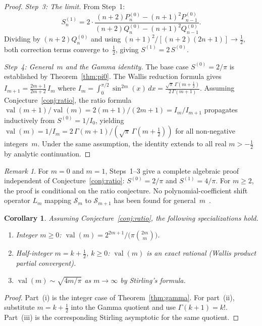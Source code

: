 \documentclass[11pt,a4paper]{article}
\theoremstyle{plain}
\newtheorem{corollary}[theorem]{Corollary}
\theoremstyle{definition}
\theoremstyle{remark}
\newtheorem{remark}[theorem]{Remark}
\newcommand{\half}{\tfrac{1}{2}}
\begin{document}
\begin{proof}
\medskip
\emph{Step~3: The limit.}
From Step~1:
\[
  S_n^{(1)}
  = 2\cdot\frac{(n{+}2)P_n^{(0)} - (n{+}1)^2 P_{n-1}^{(0)}}
              {(n{+}2)Q_n^{(0)} - (n{+}1)^2 Q_{n-1}^{(0)}}.
\]
Dividing by $(n{+}2)Q_n^{(0)}$ and using
$(n{+}1)^2/[(n{+}2)(2n{+}1)] \to \frac{1}{2}$,
both correction terms converge to~$\frac{1}{2}$, giving
$S^{(1)} = 2\,S^{(0)}$.

\medskip
\emph{Step~4: General~$m$ and the Gamma identity.}
The base case $S^{(0)} = 2/\pi$ is established by
Theorem~\ref{thm:pi0}.
The Wallis reduction formula gives
$I_{m+1} = \frac{2m{+}1}{2m{+}2}\,I_m$
where $I_m = \int_0^{\pi/2}\sin^{2m}(x)\,dx
= \frac{\sqrt{\pi}\,\Gamma(m{+}\frac{1}{2})}{2\,\Gamma(m{+}1)}$.
Assuming Conjecture~\ref{conj:ratio},
the ratio formula
$\operatorname{val}(m{+}1)/\operatorname{val}(m)
= 2(m{+}1)/(2m{+}1) = I_m/I_{m+1}$
propagates inductively from $S^{(0)} = 1/I_0$,
yielding $\operatorname{val}(m) = 1/I_m =
2\,\Gamma(m{+}1)/(\sqrt{\pi}\,\Gamma(m{+}\half))$
for all non-negative integers~$m$.
Under the same assumption, the identity extends to all real
$m > -\frac{1}{2}$ by analytic continuation.
\end{proof}

\begin{remark}
For $m = 0$ and $m = 1$, Steps~1--3 give a complete algebraic proof
independent of Conjecture~\ref{conj:ratio}:
$S^{(0)} = 2/\pi$ and $S^{(1)} = 4/\pi$.
For $m \ge 2$, the proof is conditional on the ratio conjecture.
No polynomial-coefficient shift operator $L_m$ mapping $\mathcal{S}_m$
to $\mathcal{S}_{m+1}$ has been found for general~$m$~\cite{raayoni2021}.
\end{remark}

\begin{corollary}\label{cor:special}
Assuming Conjecture~\ref{conj:ratio}, the following specializations hold.
\begin{enumerate}
\item[\textup{(i)}]
  Integer $m \ge 0$:
  $\operatorname{val}(m) = 2^{2m+1}/\bigl(\pi\binom{2m}{m}\bigr)$.
\item[\textup{(ii)}]
  Half-integer $m = k{+}\half$, $k \ge 0$:
  $\operatorname{val}(m)$ is an exact rational (Wallis product partial convergent).
\item[\textup{(iii)}]
  $\operatorname{val}(m) \sim \sqrt{4m/\pi}$
  as $m \to \infty$ by Stirling's formula.
\end{enumerate}
\end{corollary}

\begin{proof}
Part~\textup{(i)} is the integer case of Theorem~\ref{thm:gamma}.
For part~\textup{(ii)}, substitute $m=k{+}\half$ into the Gamma quotient and
use $\Gamma(k{+}1)=k!$. Part~\textup{(iii)} is the corresponding Stirling
asymptotic for the same quotient.
\end{proof}
\end{document}
